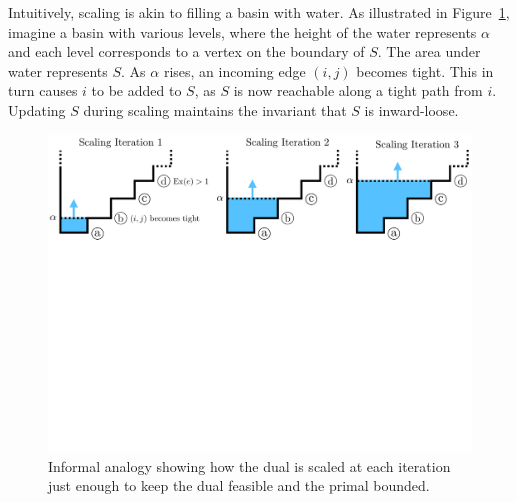 \documentclass[11pt]{article}
\makeatletter
\let\comment\todo
\newcommand{\david}[1]{\comment[nolist,color=orange!40]{@david\\ #1}}
\theoremstyle{definition}
\theoremstyle{definition}
\theoremstyle{definition}
\newcommand{\din}{\delta^{\text{in}}}
\renewcommand{\todo}[1]{\hl{TODO: #1}}
\makeatother
\begin{document}
	Intuitively, scaling is
	akin to filling a basin with water. As illustrated in
	Figure~\ref{fig:alpha},	imagine a basin with various levels,
	where the height of the water represents $\alpha$ and each
	level corresponds to a vertex on the boundary of $S$. The area under water
	represents $S$.
	As $\alpha$ rises, an incoming edge $(i, j)$ becomes tight. This in turn
	causes $i$ to be added to $S$, as $S$ is now reachable along a tight
	path from $i$. Updating $S$ during scaling maintains the invariant that
	$S$ is inward-loose.
    \begin{figure}[b!]
    \centering
    \includegraphics[width=\textwidth]{figs/alpha.pdf}
    \caption{
    \label{fig:alpha}
		Informal analogy showing how the dual is scaled at each iteration just
		enough to keep the dual feasible and the primal bounded.
    }
    \end{figure}
		
\end{document}
